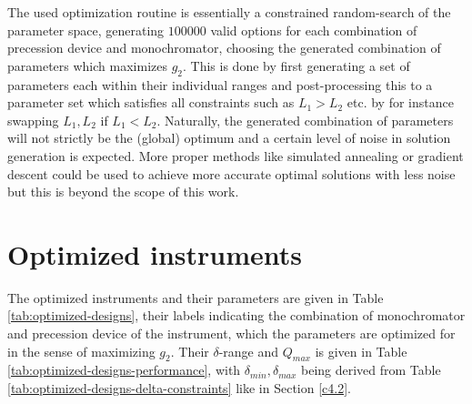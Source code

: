 The used optimization routine is essentially a constrained random-search of the parameter space, generating $100000$ valid options for each combination of precession device and monochromator, choosing the generated combination of parameters which maximizes $g_2$. This is done by first generating a set of parameters each within their individual ranges and post-processing this to a parameter set which satisfies all constraints such as $L_1>L_2$ etc. by for instance swapping $L_1, L_2$ if $L_1 < L_2$. Naturally, the generated combination of parameters will not strictly be the (global) optimum and a certain level of noise in solution generation is expected. More proper methods like simulated annealing or gradient descent could be used to achieve more accurate optimal solutions with less noise but this is beyond the scope of this work.



\section{Optimized instruments}
The optimized instruments and their parameters are given in Table \ref{tab:optimized-designs}, their labels indicating the combination of monochromator and precession device of the instrument, which the parameters are optimized for in the sense of maximizing $g_2$. Their $\delta$-range and $Q_{max}$ is given in Table \ref{tab:optimized-designs-performance}, with $\delta_{min}, \delta_{max}$ being derived from Table \ref{tab:optimized-designs-delta-constraints} like in Section \ref{c4.2}.

